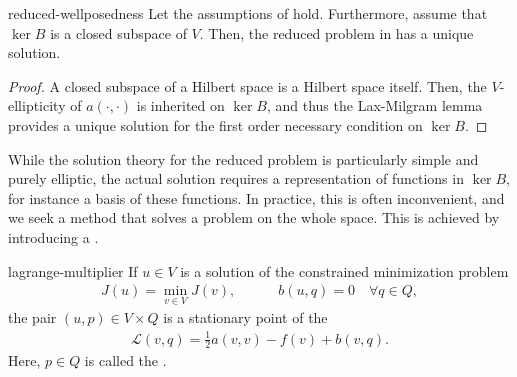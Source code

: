 \begin{Lemma}{reduced-wellposedness}
  Let the assumptions of  hold.
  Furthermore, assume that $\ker B$ is a closed subspace of $V$. Then,
  the reduced problem in  has a
  unique solution.
\end{Lemma}

\begin{proof}
  A closed subspace of a Hilbert space is a Hilbert space
  itself. Then, the $V$-ellipticity of $a(\cdot,\cdot)$ is inherited on
  $\ker B$, and thus the Lax-Milgram lemma provides a unique solution
  for the first order necessary condition on $\ker B$.
\end{proof}


\begin{intro}
  While the solution theory for the reduced problem is particularly
  simple and purely elliptic, the actual solution requires a
  representation of functions in $\ker B$, for instance a basis of
  these functions. In practice, this is often inconvenient, and we
  seek a method that solves a problem on the whole space. This is
  achieved by introducing a .
\end{intro}

\begin{Theorem}{lagrange-multiplier}
  If $u\in V$ is a solution of the constrained minimization problem
  \begin{gather}
    J(u) = \min_{v\in V} J(v), \quad\qquad
    b(u,q) = 0 \quad\forall q\in Q,
  \end{gather}
  the pair $(u,p)\in V\times Q$ is a stationary point of
  the 
  \begin{gather}
    \mathscr{L}(v,q) = \tfrac12 a(v,v) - f(v) + b(v,q).
  \end{gather}
  Here, $p\in Q$ is called the .
\end{Theorem}

